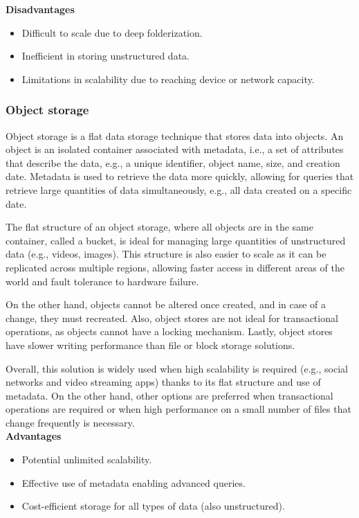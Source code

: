 \noindent\textbf{Disadvantages}
\begin{itemize}
    \item Difficult to scale due to deep folderization.
    \item Inefficient in storing unstructured data.
    \item Limitations in scalability due to reaching device or network capacity.
\end{itemize}

\subsubsection*{Object storage}

Object storage is a flat data storage technique that stores data into objects. An object is an isolated container associated with metadata, i.e., a set of attributes that describe the data, e.g., a unique identifier, object name, size, and creation date. Metadata is used to retrieve the data more quickly, allowing for queries that retrieve large quantities of data simultaneously, e.g., all data created on a specific date. 

The flat structure of an object storage, where all objects are in the same container, called a bucket, is ideal for managing large quantities of unstructured data (e.g., videos, images). This structure is also easier to scale as it can be replicated across multiple regions, allowing faster access in different areas of the world and fault tolerance to hardware failure.

On the other hand, objects cannot be altered once created, and in case of a change, they must recreated. Also, object stores are not ideal for transactional operations, as objects cannot have a locking mechanism. Lastly, object stores have slower writing performance than file or block storage solutions.

Overall, this solution is widely used when high scalability is required (e.g., social networks and video streaming apps) thanks to its flat structure and use of metadata. On the other hand, other options are preferred when transactional operations are required or when high performance on a small number of files that change frequently is necessary. \\[3mm]
\noindent\textbf{Advantages}
\begin{itemize}
    \item Potential unlimited scalability.
    \item Effective use of metadata enabling advanced queries.
    \item Cost-efficient storage for all types of data (also unstructured).
\end{itemize}

